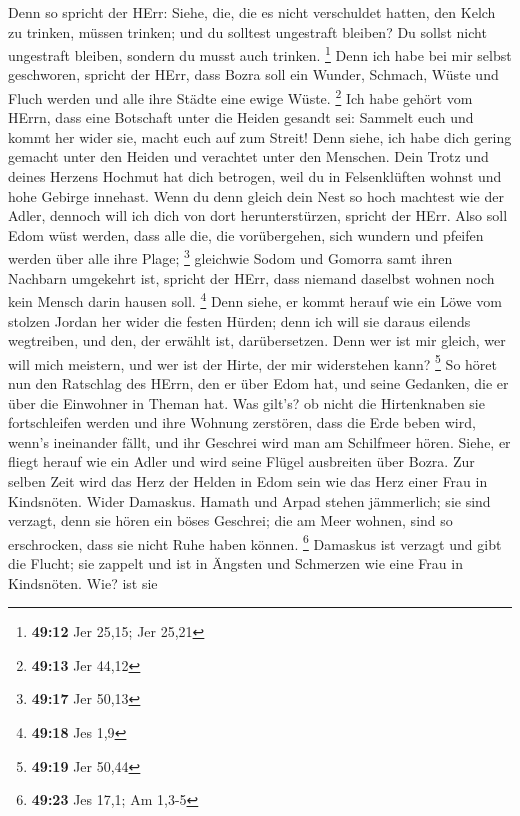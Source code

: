  Denn so spricht der HErr: Siehe, die, die es nicht
verschuldet hatten, den Kelch zu trinken, müssen trinken; und du
solltest ungestraft bleiben? Du sollst nicht ungestraft bleiben, sondern
du musst auch trinken. \footnote{\textbf{49:12} Jer 25,15; Jer 25,21}
 Denn ich habe bei mir selbst geschworen, spricht der HErr,
dass Bozra soll ein Wunder, Schmach, Wüste und Fluch werden und alle
ihre Städte eine ewige Wüste. \footnote{\textbf{49:13} Jer 44,12}
 Ich habe gehört vom HErrn, dass eine Botschaft unter die
Heiden gesandt sei: Sammelt euch und kommt her wider sie, macht euch auf
zum Streit!  Denn siehe, ich habe dich gering gemacht unter
den Heiden und verachtet unter den Menschen.  Dein Trotz
und deines Herzens Hochmut hat dich betrogen, weil du in Felsenklüften
wohnst und hohe Gebirge innehast. Wenn du denn gleich dein Nest so hoch
machtest wie der Adler, dennoch will ich dich von dort herunterstürzen,
spricht der HErr.  Also soll Edom wüst werden, dass alle
die, die vorübergehen, sich wundern und pfeifen werden über alle ihre
Plage; \footnote{\textbf{49:17} Jer 50,13}  gleichwie Sodom
und Gomorra samt ihren Nachbarn umgekehrt ist, spricht der HErr, dass
niemand daselbst wohnen noch kein Mensch darin hausen soll. \footnote{\textbf{49:18}
  Jes 1,9}  Denn siehe, er kommt herauf wie ein Löwe vom
stolzen Jordan her wider die festen Hürden; denn ich will sie daraus
eilends wegtreiben, und den, der erwählt ist, darübersetzen. Denn wer
ist mir gleich, wer will mich meistern, und wer ist der Hirte, der mir
widerstehen kann? \footnote{\textbf{49:19} Jer 50,44}  So
höret nun den Ratschlag des HErrn, den er über Edom hat, und seine
Gedanken, die er über die Einwohner in Theman hat. Was gilt's? ob nicht
die Hirtenknaben sie fortschleifen werden und ihre Wohnung zerstören,
 dass die Erde beben wird, wenn's ineinander fällt, und ihr
Geschrei wird man am Schilfmeer hören.  Siehe, er fliegt
herauf wie ein Adler und wird seine Flügel ausbreiten über Bozra. Zur
selben Zeit wird das Herz der Helden in Edom sein wie das Herz einer
Frau in Kindsnöten.  Wider Damaskus. Hamath und Arpad
stehen jämmerlich; sie sind verzagt, denn sie hören ein böses Geschrei;
die am Meer wohnen, sind so erschrocken, dass sie nicht Ruhe haben
können. \footnote{\textbf{49:23} Jes 17,1; Am 1,3-5} 
Damaskus ist verzagt und gibt die Flucht; sie zappelt und ist in Ängsten
und Schmerzen wie eine Frau in Kindsnöten.  Wie? ist sie

